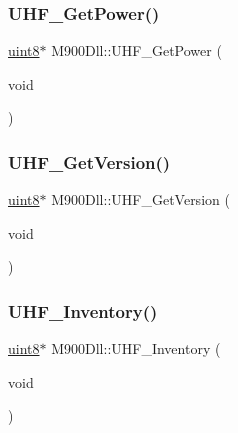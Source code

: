 \mbox{\label{class_m900_dll_a932d5e7af180d89a058eaed2302513c6}} 
\subsubsection{\texorpdfstring{UHF\_GetPower()}{UHF\_GetPower()}}
{\footnotesize\ttfamily \mbox{\hyperlink{m900dll_8h_adde6aaee8457bee49c2a92621fe22b79}{uint8}}$\ast$ M900\+Dll\+::\+U\+H\+F\+\_\+\+Get\+Power (\begin{DoxyParamCaption}\item[{void}]{ }\end{DoxyParamCaption})}

\mbox{\label{class_m900_dll_adf85ef53e761928a63bbe7e86bfcdc49}} 
\subsubsection{\texorpdfstring{UHF\_GetVersion()}{UHF\_GetVersion()}}
{\footnotesize\ttfamily \mbox{\hyperlink{m900dll_8h_adde6aaee8457bee49c2a92621fe22b79}{uint8}}$\ast$ M900\+Dll\+::\+U\+H\+F\+\_\+\+Get\+Version (\begin{DoxyParamCaption}\item[{void}]{ }\end{DoxyParamCaption})}

\mbox{\label{class_m900_dll_a0f47f84947ac9f5bdd7080319663eb31}} 
\subsubsection{\texorpdfstring{UHF\_Inventory()}{UHF\_Inventory()}\hspace{0.1cm}{\footnotesize\ttfamily [1/2]}}
{\footnotesize\ttfamily \mbox{\hyperlink{m900dll_8h_adde6aaee8457bee49c2a92621fe22b79}{uint8}}$\ast$ M900\+Dll\+::\+U\+H\+F\+\_\+\+Inventory (\begin{DoxyParamCaption}\item[{void}]{ }\end{DoxyParamCaption})}

